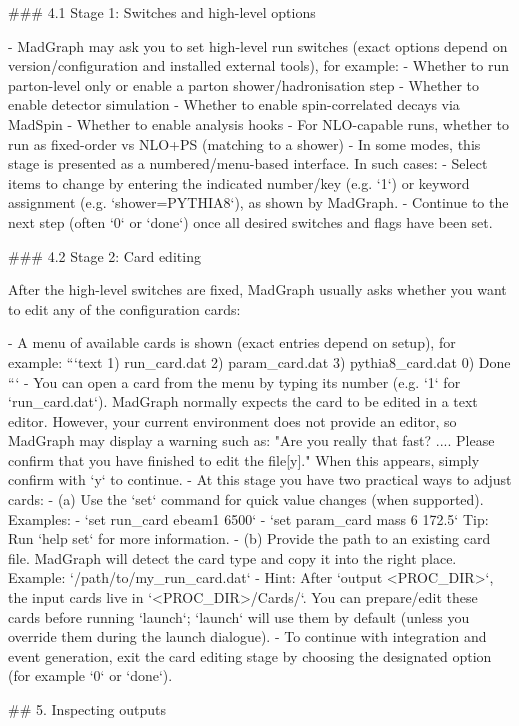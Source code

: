 \documentclass[submission, Phys]{SciPost}
\begin{document}
\begin{promptblocklit}
### 4.1 Stage 1: Switches and high-level options

- MadGraph may ask you to set high-level run switches (exact options depend on version/configuration and installed external tools), for example:
  - Whether to run parton-level only or enable a parton shower/hadronisation step
  - Whether to enable detector simulation
  - Whether to enable spin-correlated decays via MadSpin
  - Whether to enable analysis hooks
  - For NLO-capable runs, whether to run as fixed-order vs NLO+PS (matching to a shower)
- In some modes, this stage is presented as a numbered/menu-based interface. In such cases:
  - Select items to change by entering the indicated number/key (e.g. `1`) or keyword assignment (e.g. `shower=PYTHIA8`), as shown by MadGraph.
  - Continue to the next step (often `0` or `done`) once all desired switches and flags have been set.

### 4.2 Stage 2: Card editing

After the high-level switches are fixed, MadGraph usually asks whether you want to edit any of the configuration cards:

- A menu of available cards is shown (exact entries depend on setup), for example:
  ```text
  1) run_card.dat
  2) param_card.dat
  3) pythia8_card.dat
  0) Done
  ```
- You can open a card from the menu by typing its number (e.g. `1` for `run_card.dat`).
  MadGraph normally expects the card to be edited in a text editor. However, your current environment does not provide an editor, so MadGraph may display a warning such as: "Are you really that fast? .... Please confirm that you have finished to edit the file[y]." When this appears, simply confirm with `y` to continue.
- At this stage you have two practical ways to adjust cards:
  - (a) Use the `set` command for quick value changes (when supported). Examples:
    - `set run_card ebeam1 6500`
    - `set param_card mass 6 172.5`
    Tip: Run `help set` for more information.
  - (b) Provide the path to an existing card file. MadGraph will detect the card type and copy it into the right place. Example: `/path/to/my_run_card.dat`
  - Hint: After `output <PROC_DIR>`, the input cards live in `<PROC_DIR>/Cards/`. You can prepare/edit these cards before running `launch`; `launch` will use them by default (unless you override them during the launch dialogue).
- To continue with integration and event generation, exit the card editing stage by choosing the designated option (for example `0` or `done`).

## 5. Inspecting outputs


\end{promptblocklit}
\end{document}
